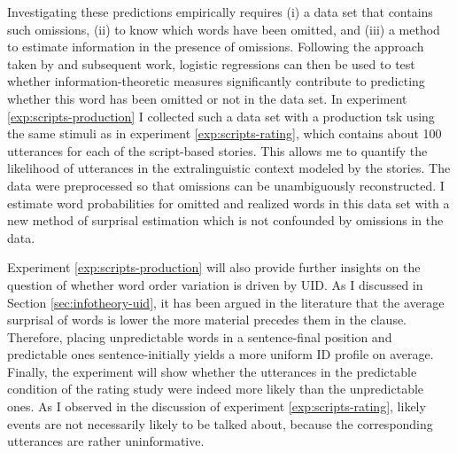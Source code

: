 Investigating these predictions empirically requires (i) a data set that contains such omissions, (ii) to know  which words have been omitted, and (iii) a method to estimate information in the presence of omissions. Following the approach taken by \citet{levy.jaeger2007} and subsequent work, logistic regressions can then be used to test whether information-theoretic measures significantly contribute to predicting whether this word has been omitted or not in the data set. In experiment \ref{exp:scripts-production} I collected such a data set with a production tsk using the same stimuli as in experiment \ref{exp:scripts-rating}, which contains about 100 utterances for each of the script-based stories. This allows me to quantify the likelihood of utterances in the extralinguistic context modeled by the stories. The data were preprocessed so that omissions can be unambiguously reconstructed. I estimate word probabilities for omitted and realized words in this data set with  a new method of surprisal estimation which is not confounded by omissions in the data.
\largerpage

Experiment \ref{exp:scripts-production} will also provide further insights on the question of whether word order variation is driven by UID. As I discussed in Section \ref{sec:infotheory-uid}, it has been argued in the literature that the average surprisal of words is lower the more material precedes them in the clause. Therefore, placing unpredictable words in a sentence-final position and predictable ones sentence-initially yields a more uniform ID profile on average. Finally, the experiment will show whether the utterances in the predictable condition of the rating study were indeed more likely than the unpredictable ones. As I observed in the discussion of experiment \ref{exp:scripts-rating}, likely events are not necessarily likely to be talked about, because the corresponding utterances are rather uninformative.

